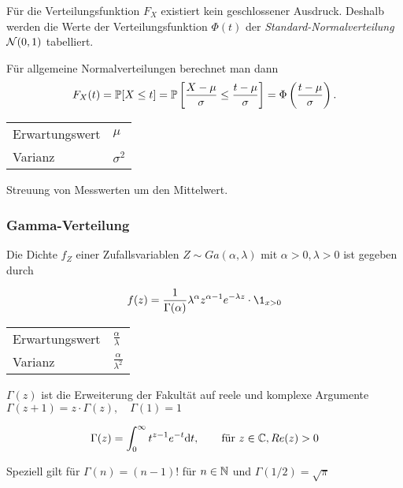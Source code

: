Für die Verteilungsfunktion \(F_X\) existiert kein geschlossener Ausdruck.
Deshalb werden die Werte der Verteilungsfunktion \(\Phi(t)\) der \emph{Standard-Normalverteilung} \(\Stdev(0,1)\) tabelliert.

Für allgemeine Normalverteilungen berechnet man dann
\[
	F_X(t) = \P[X \leq t] = \P\left[\frac{X-\mu}{\sigma}\leq\frac{t-\mu}{\sigma}\right] = \Phi\left(\frac{t-\mu}{\sigma}\right).
\]

\begin{highlight}
	\begin{tabular}{l@{ : }l}
		Erwartungswert & \(\mu\)      \\
		Varianz        & \(\sigma^2\)
	\end{tabular}
\end{highlight}

\begin{example}
	Streuung von Messwerten um den Mittelwert.
\end{example}


\subsubsection{Gamma-Verteilung}
Die Dichte \(f_Z\) einer Zufallsvariablen \(Z \sim Ga(\alpha,\lambda)\)
mit \(\alpha > 0, \lambda >0\) ist gegeben durch

\[
	f(z) = \frac{1}{\Gamma(\alpha)} \lambda^{\alpha} z^{\alpha-1} e^{-\lambda z} \cdot \1_{x>0}
\]

\begin{highlight}
	\begin{tabular}{l@{ : }l}
		Erwartungswert & \(\frac{\alpha}{\lambda}\)   \\
		Varianz        & \(\frac{\alpha}{\lambda^2}\)
	\end{tabular}
\end{highlight}

\begin{definition}[Gammafunktion]
	\(\Gamma(z)\) ist die Erweiterung der Fakultät auf reele und komplexe Argumente
	\(\Gamma(z+1) = z \cdot \Gamma(z), \quad \Gamma(1)=1\)

	\[
		\Gamma(z) = \int_0^\infty t^{z-1} e^{-t} \d t, \qquad \text{für } z \in \C, Re(z) > 0
	\]

	Speziell gilt für \(\Gamma(n)=(n-1)!\) für \(n \in \N\) und \(\Gamma(1/2)=\sqrt{\pi}\)
\end{definition}

